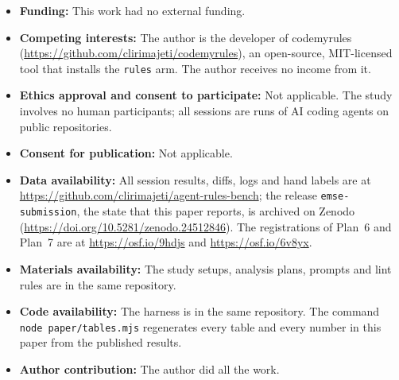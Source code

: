 \begin{itemize}
\item \textbf{Funding:} This work had no external funding.
\item \textbf{Competing interests:} The author is the developer of codemyrules (\url{https://github.com/clirimajeti/codemyrules}), an open-source, MIT-licensed tool that installs the \texttt{rules} arm. The author receives no income from it.
\item \textbf{Ethics approval and consent to participate:} Not applicable. The study involves no human participants; all sessions are runs of AI coding agents on public repositories.
\item \textbf{Consent for publication:} Not applicable.
\item \textbf{Data availability:} All session results, diffs, logs and hand labels are at \url{https://github.com/clirimajeti/agent-rules-bench}; the release \texttt{emse-submission}, the state that this paper reports, is archived on Zenodo (\url{https://doi.org/10.5281/zenodo.24512846}). The registrations of Plan~6 and Plan~7 are at \url{https://osf.io/9hdjs} and \url{https://osf.io/6v8yx}.
\item \textbf{Materials availability:} The study setups, analysis plans, prompts and lint rules are in the same repository.
\item \textbf{Code availability:} The harness is in the same repository. The command \texttt{node paper/tables.mjs} regenerates every table and every number in this paper from the published results.
\item \textbf{Author contribution:} The author did all the work.
\end{itemize}
